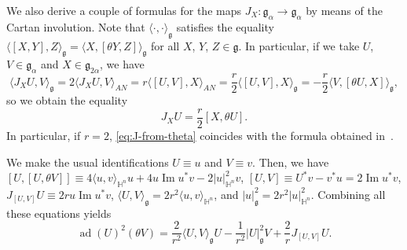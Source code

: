 \documentclass[12pt, a4paper,draft]{amsart}
\newcommand{\g}{\mathfrak}
\newcommand{\ad}{\operatorname{ad}}
\renewcommand{\H}{\mathbb{H}}
\renewcommand{\Im}{\operatorname{Im}}
\theoremstyle{remark}
\begin{document}
We also derive a couple of formulas for the maps $J_{X}\colon \g{g}_{\alpha}\to\g{g}_{\alpha}$ by means of the Cartan involution.
Note that $\langle\cdot,\cdot\rangle_{\g{g}}$ satisfies the equality $\langle[X,Y],Z\rangle_{\g{g}}=\langle X,[\theta Y,Z]\rangle_{\g{g}}$ for all $X$, $Y$, $Z\in\g{g}$.
In particular, if we take $U$, $V\in \g{g}_{\alpha}$ and $X\in\g{g}_{2\alpha}$, we have
\begin{equation*}
	\langle J_{X}U,V\rangle_{\g{g}}=2\langle J_{X}U,V\rangle_{AN}=r\langle [U,V],X\rangle_{AN}=\frac{r}{2}\langle[U,V],X\rangle_{\g{g}}=-\frac{r}{2}\langle V,[\theta U,X] \rangle_{\g{g}},
\end{equation*}
so we obtain the equality
\begin{equation}\label{eq:J-from-theta}
	J_{X}U=\frac{r}{2}[X,\theta U].
\end{equation}
In particular, if $r=2$, \eqref{eq:J-from-theta} coincides with the formula obtained in~\cite[Proposition~5.9]{CowlingDooleyKoranyiRicci}.

We make the usual identifications $U\equiv u$ and $V\equiv v$.
Then, we have $[U,[U,\theta V]]\equiv 4\langle u,v\rangle_{\H^{n}}u+4u\Im u^* v-2\lvert u\rvert^2_{\H^n}v$,
$[U,V]\equiv U^*v-v^*u=2\Im u^*v$,
$J_{[U,V]}U\equiv 2ru\Im u^*v$,
$\langle U,V\rangle_{\g{g}}=2r^2\langle u,v\rangle_{\H^n}$,
and $\lvert u\rvert^2_{\g{g}}=2r^2\lvert u\rvert^2_{\H^n}$.
Combining all these equations yields
\[
\ad(U)^2(\theta V)=
\frac{2}{r^2}\langle U,V\rangle_{\g{g}}U
-\frac{1}{r^2}\lvert U\rvert^2_{\g{g}} V
+\frac{2}{r}J_{[U,V]}U.
\]
\end{document}
